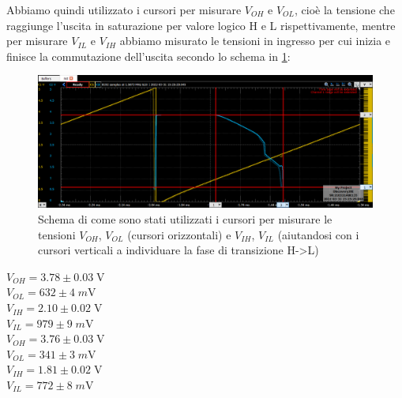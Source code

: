 \documentclass[10pt, a4paper, italian]{article}
\begin{document}
Abbiamo quindi utilizzato i cursori per misurare $V_{OH}$ e $V_{OL}$, cioè
la tensione che raggiunge l'uscita in saturazione per valore logico H e L
rispettivamente, mentre per misurare $V_{IL}$ e $V_{IH}$ abbiamo misurato le
tensioni in ingresso per cui inizia e finisce la commutazione dell'uscita
secondo lo schema in \cref{fig: trans}:
\begin{figure}[htbp]
\centering
	\includegraphics[width=\textwidth]{trans}
	\caption{Schema di come sono stati utilizzati i cursori per misurare le tensioni $V_{OH}$, $V_{OL}$ (cursori orizzontali) e $V_{IH}$, $V_{IL}$ (aiutandosi con i cursori verticali a individuare la fase di transizione H->L)}
	\label{fig: trans}
\end{figure}
\begin{multicols}{2}
    \centering
    $V_{OH} = 3.78 \pm 0.03\; \si{\V}$ \\
	$V_{OL} = 632 \pm 4 \; \si{m\V}$ \\
	$V_{IH} = 2.10 \pm 0.02 \; \si{\V} $\\
	$V_{IL} = 979 \pm 9\; \si{m\V} $\\
    
    $V_{OH} = 3.76 \pm 0.03\; \si{\V}$ \\
	$V_{OL} = 341 \pm 3 \; \si{m\V}$ \\
	$V_{IH} = 1.81 \pm 0.02 \; \si{\V} $\\
	$V_{IL} = 772 \pm 8\; \si{m\V} $\\
\end{multicols}
\end{document}
